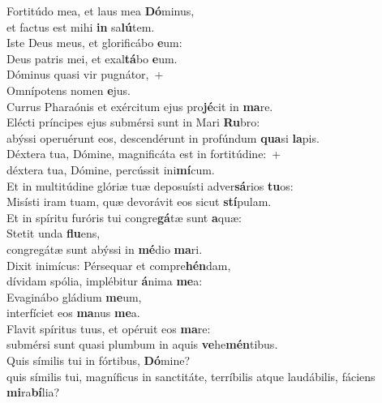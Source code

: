 \evenverse Fortitúdo mea, et laus mea \textbf{Dó}minus,~\*\\
\evenverse et factus est mihi \textbf{in} sa\textbf{lú}tem.\\
\oddverse Iste Deus meus, et glorificábo \textbf{e}um:~\*\\
\oddverse Deus patris mei, et exal\textbf{tá}bo \textbf{e}um.\\
\evenverse Dóminus quasi vir pugnátor,~+\\
\evenverse  Omnípotens nomen \textbf{e}jus.~\*\\
\evenverse Currus Pharaónis et exércitum ejus pro\textbf{jé}cit in \textbf{ma}re.\\
\oddverse Elécti príncipes ejus submérsi sunt in Mari \textbf{Ru}bro:~\*\\
\oddverse abýssi operuérunt eos, descendérunt in profúndum \textbf{qua}si \textbf{la}pis.\\
\evenverse Déxtera tua, Dómine, magnificáta est in fortitúdine:~+\\
\evenverse  déxtera tua, Dómine, percússit ini\textbf{mí}cum.~\*\\
\evenverse Et in multitúdine glóriæ tuæ deposuísti adver\textbf{sá}rios \textbf{tu}os:\\
\oddverse Misísti iram tuam, quæ devorávit eos sicut \textbf{stí}pulam.~\*\\
\oddverse Et in spíritu furóris tui congre\textbf{gá}tæ sunt \textbf{a}quæ:\\
\evenverse Stetit unda \textbf{flu}ens,~\*\\
\evenverse congregátæ sunt abýssi in \textbf{mé}dio \textbf{ma}ri.\\
\oddverse Dixit inimícus: Pérsequar et compre\textbf{hén}dam,~\*\\
\oddverse dívidam spólia, implébitur \textbf{á}nima \textbf{me}a:\\
\evenverse Evaginábo gládium \textbf{me}um,~\*\\
\evenverse interfíciet eos \textbf{ma}nus \textbf{me}a.\\
\oddverse Flavit spíritus tuus, et opéruit eos \textbf{ma}re:~\*\\
\oddverse submérsi sunt quasi plumbum in aquis \textbf{ve}he\textbf{mén}tibus.\\
\evenverse Quis símilis tui in fórtibus, \textbf{Dó}mine?~\*\\
\evenverse quis símilis tui, magníficus in sanctitáte, terríbilis atque laudábilis, fáciens \textbf{mi}ra\textbf{bí}lia?\\
